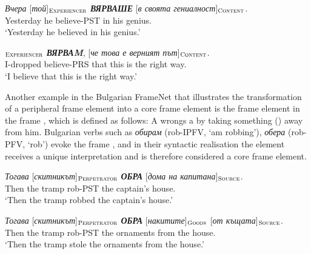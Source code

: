 \documentclass[output=paper,colorlinks,citecolor=brown]{langscibook}
\begin{document}
 \begin{exe}
 \ex  \label{ch01:ex:34}
 \gll \textit{Вчера}   [\textit{той}]$_{\text{\textsc{Experiencer}}}$    \textit{\textbf{ВЯРВАШЕ}}  [\textit{в своята гениалност}]$_{\text{\textsc{Content}}}$. \\
Yesterday {he}  believe-PST  {in his genius}. \\
 \glt `Yesterday he believed in his genius.'
 \end{exe} 


 \begin{exe}
 \ex  \label{ch01:ex:35}
 \gll  [DNI]$_{\text{\textsc{Experiencer}}}$   \textit{\textbf{ВЯРВАM}},  [\textit{че това е верният път}]$_{\text{\textsc{Content}}}$. \\
 {I-dropped} believe-PRS  {that this is the right way}. \\
 \glt `I believe that this is the right way.'
 \end{exe} 
 
Another example in the Bulgarian FrameNet that illustrates the transformation of a peripheral frame element into a core frame element is the frame element  in the frame , which is defined as follows: A  wrongs a  by taking something () away from him. Bulgarian verbs such as \textit{обирам} (rob-IPFV, `am robbing'), \textit{обера} (rob-PFV, `rob') evoke the frame , and in their syntactic realisation the element  receives a unique interpretation and is therefore considered a core frame element.

 \begin{exe}
 \ex  \label{ch01:ex:36}
 \gll \textit{Тогава}   [\textit{скитникът}]$_{\text{\textsc{Perpetrator}}}$    \textit{\textbf{ОБРА}}  [\textit{дома на капитана}]$_{\text{\textsc{Source}}}$. \\
 Then  {the tramp} rob-PST  {the captain's house}. \\
 \glt `Then the tramp robbed the captain's house.'
 \end{exe} 

 \begin{exe}
 \ex  \label{ch01:ex:37}
 \gll \textit{Тогава}  [\textit{скитникът}]$_{\text{\textsc{Perpetrator}}}$   \textit{\textbf{ОБРА}}  [\textit{накитите}]$_{\text{\textsc{Goods}}}$  
 [\textit{от къщата}]$_{\text{\textsc{Source}}}$. \\
 Then  {the tramp}  rob-PST   {the ornaments} {from the house}. \\
 \glt `Then the tramp stole the ornaments from the house.'
 \end{exe} 
 
\end{document}
